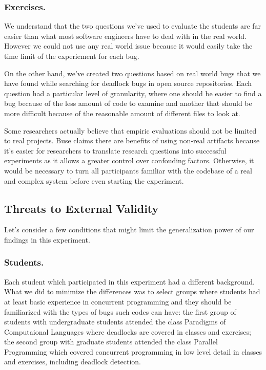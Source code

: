 \subsubsection{Exercises.}

We understand that the two questions we've used to evaluate the students are far easier than what most software engineers have to deal with in the real world. However we could not use any real world issue because it would easily take the time limit of the experiement for each bug.

On the other hand, we've created two questions based on real world bugs that we have found while searching for deadlock bugs in open source repositories. Each question had a particular level of granularity, where one should be easier to find a bug because of the less amount of code to examine and another that should be more difficult because of the reasonable amount of different files to look at.

Some researchers actually believe that empiric evaluations should not be limited to real projects. Buse claims there are benefits of using non-real artifacts \cite{buse} because it's easier for researchers to translate research questions into successful experiments as it allows a greater control over confouding factors. Otherwise, it would be necessary to turn all participants familiar with the codebase of a real and complex system before even starting the experiment. 

\subsection{Threats to External Validity}

Let's consider a few conditions that might limit the generalization power of our findings in this experiment.

\subsubsection{Students.}

Each student which participated in this experiment had a different background. What we did to minimize the differences was to select groups where students had at least basic experience in concurrent programming and they should be familiarized with the types of bugs such codes can have: the first group of students with undergraduate students attended the class Paradigms of Computaional Languages where deadlocks are covered in classes and exercises; the second group with graduate students attended the class Parallel Programming which covered concurrent programming in low level detail in classes and exercises, including deadlock detection.

